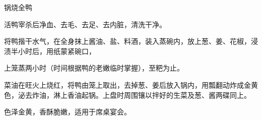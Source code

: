 \begin{recipe}{锅烧全鸭}

\ingredients


\preparation

\step 活鸭宰杀后净血、去毛、去足、去内脏，清洗干净。

\step 将鸭揩干水气，在全身抹上酱油、盐、料酒，装入蒸碗内，放上葱、姜、花椒，浸
渍半小时后，用纸蒙紧碗口，

上笼蒸两小时（时间根据鸭的老嫩临时掌握），至粑为止。

\step 菜油在旺火上烧红，将鸭由笼上取出，去掉葱、姜后放入锅内，用瓢翻动炸成金黄
色，泌去炸油，淋上香油起锅。上盘时周围镶以拌好的生菜及葱、酱两碟同上。

\features

色泽金黄，香酥脆嫩，适用于席桌宴会。

\end{recipe}

